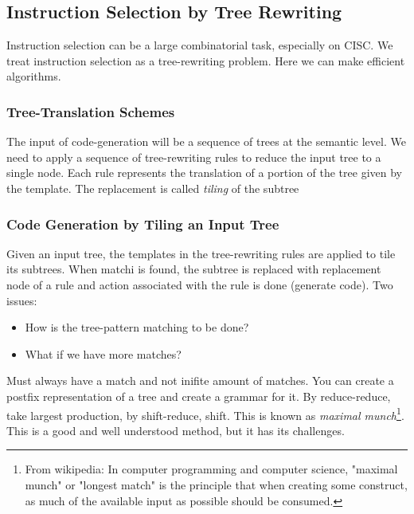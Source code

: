 \documentclass{article}
\begin{document}

\subsection{Instruction Selection by Tree Rewriting} %
\label{sub:Instruction Selection by Tree Rewriting}
Instruction selection can be a large combinatorial task, especially on CISC. We treat instruction selection as a tree-rewriting problem. Here we can make efficient algorithms.

\subsubsection{Tree-Translation Schemes} %
\label{ssub:Tree-Translation Schemes}
The input of code-generation will be a sequence of trees at the semantic level. We need to apply a sequence of tree-rewriting rules to reduce the input tree to a single node. Each rule represents the translation of a portion of the tree given by the template. The replacement is called \emph{tiling} of the subtree

\subsubsection{Code Generation by Tiling an Input Tree} %
\label{ssub:Code Generation by Tiling an Input Tree}
Given an input tree, the templates in the tree-rewriting rules are applied to tile its subtrees. When matchi is found, the subtree is replaced with replacement node of a rule and action associated with the rule is done (generate code). Two issues:
\begin{itemize}
	\item How is the tree-pattern matching to be done?
	\item What if we have more matches?
\end{itemize}
Must always have a match and not inifite amount of matches. You can create a postfix representation of a tree and create a grammar for it. By reduce-reduce, take largest production, by shift-reduce, shift. This is known as \emph{maximal munch}\footnote{From wikipedia: In computer programming and computer science, "maximal munch" or "longest match" is the principle that when creating some construct, as much of the available input as possible should be consumed.}. This is a good and well understood method, but it has its challenges.
\end{document}
